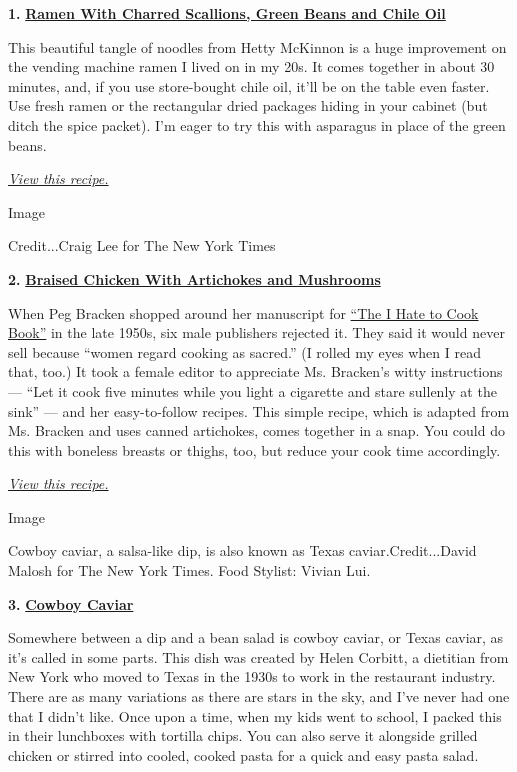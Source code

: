 \textbf{1.}
\href{https://cooking.nytimes3xbfgragh.onion/recipes/1021339-ramen-with-charred-scallions-green-beans-and-chile-oil}{\textbf{Ramen
With Charred Scallions, Green Beans and Chile Oil}}

This beautiful tangle of noodles from Hetty McKinnon is a huge
improvement on the vending machine ramen I lived on in my 20s. It comes
together in about 30 minutes, and, if you use store-bought chile oil,
it'll be on the table even faster. Use fresh ramen or the rectangular
dried packages hiding in your cabinet (but ditch the spice packet). I'm
eager to try this with asparagus in place of the green beans.

\emph{\href{https://cooking.nytimes3xbfgragh.onion/recipes/1021339-ramen-with-charred-scallions-green-beans-and-chile-oil}{View
this recipe.}}

Image

Credit...Craig Lee for The New York Times

\textbf{2.}
\href{https://cooking.nytimes3xbfgragh.onion/recipes/1740-braised-chicken-with-artichokes-and-mushrooms}{\textbf{Braised
Chicken With Artichokes and Mushrooms}}

When Peg Bracken shopped around her manuscript for
\href{https://www.amazon.com/Hate-Cook-Book-50th-Anniversary/dp/0446545929}{``The
I Hate to Cook Book''} in the late 1950s, six male publishers rejected
it. They said it would never sell because ``women regard cooking as
sacred.'' (I rolled my eyes when I read that, too.) It took a female
editor to appreciate Ms. Bracken's witty instructions --- ``Let it cook
five minutes while you light a cigarette and stare sullenly at the
sink'' --- and her easy-to-follow recipes. This simple recipe, which is
adapted from Ms. Bracken and uses canned artichokes, comes together in a
snap. You could do this with boneless breasts or thighs, too, but reduce
your cook time accordingly.

\href{https://cooking.nytimes3xbfgragh.onion/recipes/1740-braised-chicken-with-artichokes-and-mushrooms}{\emph{View
this recipe.}}

Image

Cowboy caviar, a salsa-like dip, is also known as Texas
caviar.Credit...David Malosh for The New York Times. Food Stylist:
Vivian Lui.

\textbf{3.}
\href{https://cooking.nytimes3xbfgragh.onion/recipes/1020433-cowboy-caviar}{\textbf{Cowboy
Caviar}}

Somewhere between a dip and a bean salad is cowboy caviar, or Texas
caviar, as it's called in some parts. This dish was created by Helen
Corbitt, a dietitian from New York who moved to Texas in the 1930s to
work in the restaurant industry. There are as many variations as there
are stars in the sky, and I've never had one that I didn't like. Once
upon a time, when my kids went to school, I packed this in their
lunchboxes with tortilla chips. You can also serve it alongside grilled
chicken or stirred into cooled, cooked pasta for a quick and easy pasta
salad.

